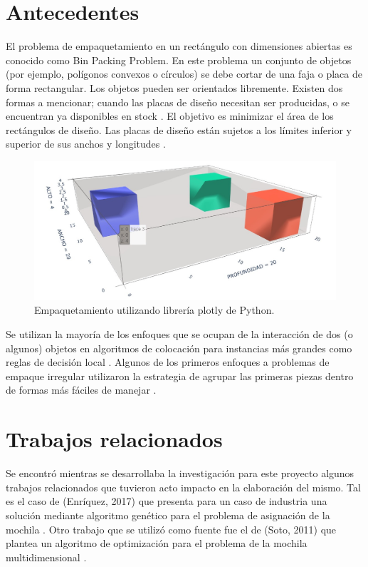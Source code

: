 \documentclass[3pt,twocolumn]{elsarticle}
\begin{document}
\section{Antecedentes}
El problema de empaquetamiento en un rectángulo con dimensiones abiertas es conocido como Bin Packing Problem. En este problema un conjunto de objetos (por ejemplo, polígonos convexos o círculos) se debe cortar de una faja o placa de forma rectangular. Los objetos pueden ser orientados libremente. Existen dos formas a mencionar; cuando las placas de diseño necesitan ser producidas, o se encuentran ya disponibles en stock \cite{andreas}. El objetivo es minimizar el área de los rectángulos de diseño. Las placas de diseño están sujetos a los límites inferior y superior de sus anchos y longitudes
\cite{luiz}.
\begin{figure}[ptb]
	\begin{center}
		\includegraphics[width=\linewidth]{Imag1.jpeg}
	\end{center}
	\caption{Empaquetamiento utilizando librería plotly de Python.\label{rmsf}}
\end{figure}
Se utilizan la mayoría de los enfoques que se ocupan de la interacción de dos (o algunos) objetos en algoritmos de colocación para instancias más grandes como reglas de decisión local \cite{benel}. Algunos de los primeros enfoques a problemas de empaque irregular utilizaron la estrategia de agrupar las primeras piezas dentro de formas más fáciles de manejar \cite{litv}.  
\section{Trabajos relacionados}
Se encontró mientras se desarrollaba la investigación para este proyecto algunos trabajos relacionados que tuvieron acto impacto en la elaboración del mismo. Tal es el caso de (Enríquez, 2017) que presenta para un caso de industria una solución mediante algoritmo genético para el problema de asignación de la mochila \cite{gladys}.
Otro trabajo que se utilizó como fuente fue el de (Soto, 2011) que plantea un algoritmo de optimización para el problema de la mochila multidimensional \cite{soto}.  
\end{document}
